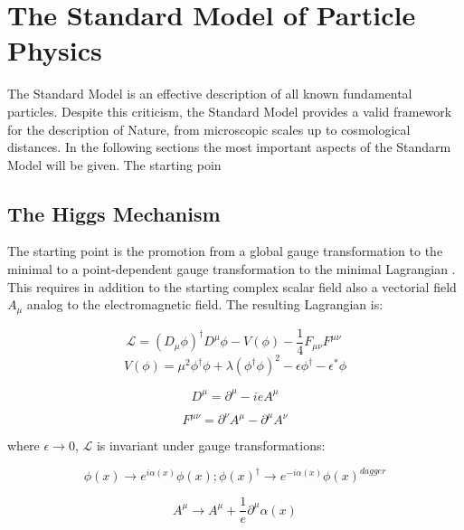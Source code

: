 \section{The Standard Model of Particle Physics}

The Standard Model \cite{Spiesberger:2000ks} is an effective description of all known fundamental particles.  Despite this criticism, the Standard Model provides a valid framework for the description of Nature, from microscopic scales up to cosmological distances. In the following sections the most important aspects of the Standarm Model will be given. The starting poin

\subsection{The Higgs Mechanism}
\label{higgs_mechanism}

The starting point is the promotion from a global gauge transformation to the minimal to a point-dependent gauge transformation to the minimal Lagrangian . This requires in addition to the starting complex scalar field also a vectorial field $A_{\mu}$ analog to the electromagnetic field. The resulting Lagrangian is:

\begin{equation}
\mathcal{L} = (D_{\mu}\phi)^{\dagger} D^{\mu}\phi - V (\phi) - \dfrac{1}{4}F_{\mu\nu}F^{\mu\nu}\
\label{eq::lagrangian_min}
\end{equation}
\begin{equation}
V(\phi)=\mu^{2}\phi^{\dagger}\phi+\lambda(\phi^{\dagger}\phi)^{2} -\epsilon\phi^{\dagger} -\epsilon^{*}\phi
\end{equation}

\begin{equation}
D^{\mu} = \partial^{\mu} - ieA^{\mu}
\end{equation}

\begin{equation}
F^{\mu\nu} =\partial^{\nu}A^{\mu} - \partial^{\mu}A^{\nu}
\end{equation}

where $\epsilon \rightarrow 0$, $\mathcal{L}$ is invariant under gauge transformations:

\begin{equation}
\phi(x) \rightarrow e^{i\alpha(x)}\phi(x); \phi(x)^{\dagger} \rightarrow e ^{-i\alpha(x)}\phi(x)^{dagger}
\end{equation}

\begin{equation}
A^{\mu} \rightarrow A^{\mu} + \dfrac{1}{e}\partial^{\mu}\alpha(x)
\label{eq::a_tranform}
\end{equation}

